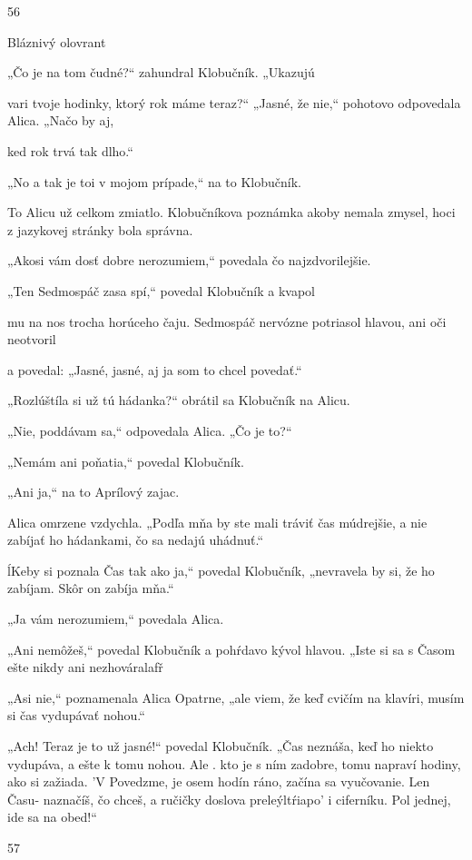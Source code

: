 \documentclass[12pt]{book}
\begin{document}
\begin{Parallel}[p]{}{}
{56

Bláznivý olovrant

„Čo je na tom čudné?“ zahundral Klobučník. „Ukazujú

vari tvoje hodinky, ktorý rok máme teraz?“
„Jasné, že nie,“ pohotovo odpovedala Alica. „Načo by aj,

ked rok trvá tak dlho.“

„No a tak je toi v mojom prípade,“ na to Klobučník.

To Alicu už celkom zmiatlo. Klobučníkova poznámka
akoby nemala zmysel, hoci z jazykovej stránky bola
správna.

„Akosi vám dosť dobre nerozumiem,“ povedala čo
najzdvorilejšie.

„Ten Sedmospáč zasa spí,“ povedal Klobučník a kvapol

mu na nos trocha horúceho čaju.
Sedmospáč nervózne potriasol hlavou, ani oči neotvoril

 

a povedal:
„Jasné, jasné, aj ja som to chcel povedať.“

„Rozlúštíla si už tú hádanka?“ obrátil sa Klobučník na
Alicu.

„Nie, poddávam sa,“ odpovedala Alica. „Čo je to?“

„Nemám ani poňatia,“ povedal Klobučník.

„Ani ja,“ na to Aprílový zajac.

Alica omrzene vzdychla. „Podľa mňa by ste mali tráviť
čas múdrejšie, a nie zabíjať ho hádankami, čo sa nedajú
uhádnuť.“

ĺKeby si poznala Čas tak ako ja,“ povedal Klobučník,
„nevravela by si, že ho zabíjam. Skôr on zabíja mňa.“

„Ja vám nerozumiem,“ povedala Alica.

„Ani nemôžeš,“ povedal Klobučník a pohŕdavo kývol
hlavou. „Iste si sa s Časom ešte nikdy ani nezhováralafř

„Asi nie,“ poznamenala Alica Opatrne, „ale viem, že keď
cvičím na klavíri, musím si čas vydupávať nohou.“

„Ach! Teraz je to už jasné!“ povedal Klobučník. „Čas
neznáša, keď ho niekto vydupáva, a ešte k tomu nohou. Ale
. kto je s ním zadobre, tomu napraví hodiny, ako si zažiada.
'V Povedzme, je osem hodín ráno, začína sa vyučovanie. Len
Času- naznačíš, čo chceš, a ručičky doslova  preleýltŕiapo'
i ciferníku. Pol jednej, ide sa na obed!“

57

 

}
\end{Parallel}
\end{document}
